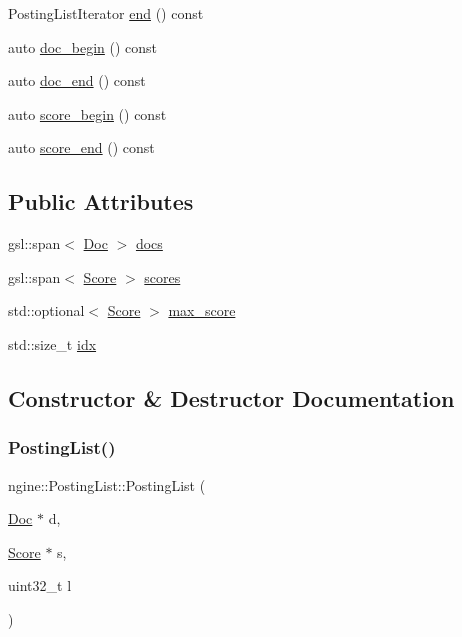 \begin{DoxyCompactItemize}
\item 
Posting\+List\+Iterator \hyperlink{classngine_1_1PostingList_a2ff54c421c572d7c45dea2debc76e573}{end} () const
\item 
auto \hyperlink{classngine_1_1PostingList_a99364a59a6078e1a58d29c4246872d47}{doc\+\_\+begin} () const
\item 
auto \hyperlink{classngine_1_1PostingList_a69d22ec64820b204c5446429ae0f2631}{doc\+\_\+end} () const
\item 
auto \hyperlink{classngine_1_1PostingList_ae40f0a86bb9ea55ee42015ff64e4344a}{score\+\_\+begin} () const
\item 
auto \hyperlink{classngine_1_1PostingList_a1a16e66065722828d2c2fed0029bb7d8}{score\+\_\+end} () const
\end{DoxyCompactItemize}
\subsection*{Public Attributes}
\begin{DoxyCompactItemize}
\item 
gsl\+::span$<$ \hyperlink{structngine_1_1Doc}{Doc} $>$ \hyperlink{classngine_1_1PostingList_a576b13bd7cd2ff09b8795424ba484a7a}{docs}
\item 
gsl\+::span$<$ \hyperlink{structngine_1_1Score}{Score} $>$ \hyperlink{classngine_1_1PostingList_afbb6ea1aacb70cf1f63cc326ab152606}{scores}
\item 
std\+::optional$<$ \hyperlink{structngine_1_1Score}{Score} $>$ \hyperlink{classngine_1_1PostingList_a11449cec5e29b130a17a001d9b7c93e9}{max\+\_\+score}
\item 
std\+::size\+\_\+t \hyperlink{classngine_1_1PostingList_af30eae543501057e70288d14477896a5}{idx}
\end{DoxyCompactItemize}


\subsection{Constructor \& Destructor Documentation}
\mbox{\label{classngine_1_1PostingList_ae1fe89ac9f77d8f73083fa71ed3abcfd}} 
\subsubsection{\texorpdfstring{Posting\+List()}{PostingList()}\hspace{0.1cm}{\footnotesize\ttfamily [1/2]}}
{\footnotesize\ttfamily ngine\+::\+Posting\+List\+::\+Posting\+List (\begin{DoxyParamCaption}\item[{\hyperlink{structngine_1_1Doc}{Doc} $\ast$}]{d,  }\item[{\hyperlink{structngine_1_1Score}{Score} $\ast$}]{s,  }\item[{uint32\+\_\+t}]{l }\end{DoxyParamCaption})\hspace{0.3cm}{\ttfamily [inline]}}

